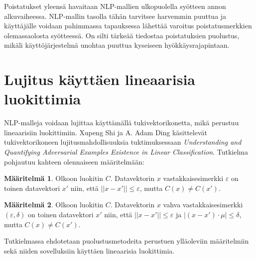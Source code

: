 Poistatukset yleensä havaitaan NLP-mallien ulkopuolella syötteen annon alkuvaiheessa. NLP-mallin tasolla tähän tarvitsee harvemmin puuttua ja käyttäjälle voidaan pahimmassa tapauksessa lähettää varoitus poistatusmerkkien olemassaolosta syötteessä. On silti tärkeää tiedostaa poistatuksien puolustus, mikäli käyttöjärjestelmä unohtaa puuttua kyseiseen hyökkäysrajapintaan.

\section{Lujitus käyttäen lineaarisia luokittimia}
NLP-malleja voidaan lujittaa käyttämällä tukivektorikonetta, mikä perustuu lineaarisiin luokittimiin. Xupeng Shi ja A. Adam Ding käsittelevät tukivektorikoneen lujitusmahdollisuuksia tuktimuksessaan \textit{Understanding and Quantifying Adversarial Examples Existence in Linear Classification}. Tutkielma pohjautuu kahteen olennaiseen määritelmään:

\theoremstyle{definition}
\newtheorem{definition}{Määritelmä}

\begin{definition}
  Olkoon luokitin $C$. Datavektorin $x$ vastakkaisesimerkki $\varepsilon$ on toinen datavektori $x'$ niin, että $||x-x'||\leq \varepsilon$, mutta $C(x) \not = C(x')$.
\end{definition}

\begin{definition}
  Olkoon luokitin $C$. Datavektorin $x$ vahva vastakkaisesimerkki $(\varepsilon, \delta)$ on toinen datavektori $x'$ niin, että $||x-x'||\leq \varepsilon$ ja $|(x-x')\cdot \mu|\leq\delta$, mutta $C(x) \not = C(x')$.
\end{definition}

Tutkielmassa ehdotetaan puolustusmetodeita perustuen ylläoleviin määritelmiin sekä niiden sovelluksiin käyttäen lineaarisia luokittimia.